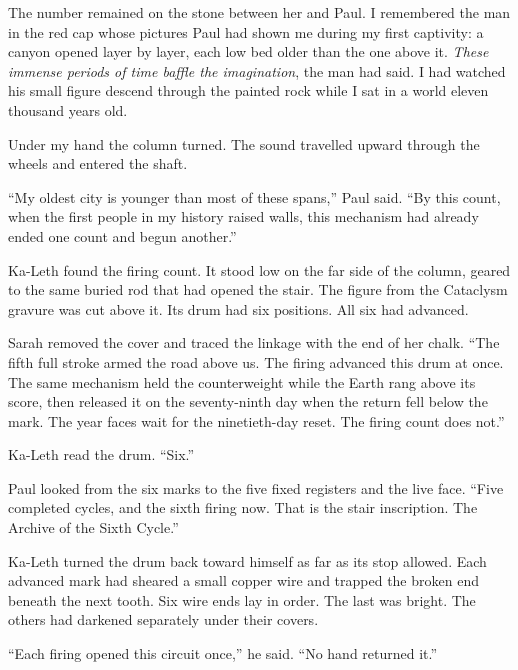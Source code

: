 The number remained on the stone between her and Paul. I remembered the man in the red cap whose pictures Paul had shown me during my first captivity: a canyon opened layer by layer, each low bed older than the one above it. \emph{These immense periods of time baffle the imagination}, the man had said. I had watched his small figure descend through the painted rock while I sat in a world eleven thousand years old.\par

Under my hand the column turned. The sound travelled upward through the wheels and entered the shaft.\par

``My oldest city is younger than most of these spans,'' Paul said. ``By this count, when the first people in my history raised walls, this mechanism had already ended one count and begun another.''\par

\ornament

Ka-Leth found the firing count. It stood low on the far side of the column, geared to the same buried rod that had opened the stair. The figure from the Cataclysm gravure was cut above it. Its drum had six positions. All six had advanced.\par

Sarah removed the cover and traced the linkage with the end of her chalk. ``The fifth full stroke armed the road above us. The firing advanced this drum at once. The same mechanism held the counterweight while the Earth rang above its score, then released it on the seventy-ninth day when the return fell below the mark. The year faces wait for the ninetieth-day reset. The firing count does not.''\par

Ka-Leth read the drum. ``Six.''\par

Paul looked from the six marks to the five fixed registers and the live face. ``Five completed cycles, and the sixth firing now. That is the stair inscription. The Archive of the Sixth Cycle.''\par

Ka-Leth turned the drum back toward himself as far as its stop allowed. Each advanced mark had sheared a small copper wire and trapped the broken end beneath the next tooth. Six wire ends lay in order. The last was bright. The others had darkened separately under their covers.\par

``Each firing opened this circuit once,'' he said. ``No hand returned it.''\par

